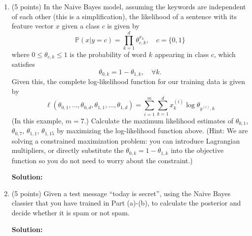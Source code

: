 \documentclass[twoside,10pt]{article}
\begin{document}
\begin{enumerate}
\begin{enumerate}
\item (5 points) In the Naive Bayes model, assuming the keywords are independent of each other (this is a simplification), the likelihood of a sentence with its feature vector $x$ given a class $c$ is given by 
\[
\mathbb P (x|y = c) = \prod_{k=1}^d \theta_{c, k}^{x_k}, \quad c = \{0, 1\}
\]
where $0 \leq \theta_{c,k} \leq 1$ is the probability of word $k$ appearing in class $c$, which satisfies 
\[\theta_{0,k} = 1- \theta_{1, k} , \quad \forall k.\] Given this, the complete log-likelihood function for our training data is given by
\[
\ell(\theta_{0,1}, \ldots, \theta_{0, d}, \theta_{1,1}, \ldots, \theta_{1, d}) = 
\sum_{i=1}^m \sum_{k=1}^d x_k^{(i)} \log \theta_{y^{(i)}, k}
\]
(In this example, $m = 7$.)
 Calculate the maximum likelihood estimates of $\theta_{0,1}$, $\theta_{0,7}$, $\theta_{1,1}$, $\theta_{1,15}$ by maximizing the log-likelihood function above.
 (Hint: We are solving a constrained maximization problem: you can introduce Lagrangian multipliers, or directly substitute the $\theta_{0,k} = 1- \theta_{1, k}$ into the objective function so you do not need to worry about the constraint.)
\begin{tcolorbox}
\textbf{Solution:}
\end{tcolorbox}

\item (5 points) Given a test message ``\textsf{today is secret}'', using the Naive Bayes classier that you have trained in Part (a)-(b), to calculate the posterior and decide whether it is spam or not spam.
\begin{tcolorbox}
\textbf{Solution:}
\end{tcolorbox}
\end{enumerate}


\end{enumerate}
\end{document}
